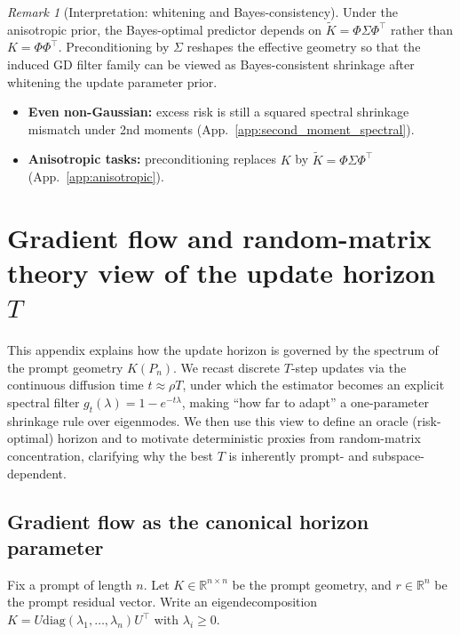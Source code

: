 \documentclass{article}
\theoremstyle{plain}
\theoremstyle{definition}
\theoremstyle{remark}
\newtheorem{remark}[theorem]{Remark}
\begin{document}
\begin{remark}[Interpretation: whitening and Bayes-consistency]
\label{rem:whitening_app}
Under the anisotropic prior, the Bayes-optimal predictor depends on $\widetilde K=\Phi\Sigma\Phi^\top$ rather than $K=\Phi\Phi^\top$. Preconditioning by $\Sigma$ reshapes the effective geometry so that the induced GD filter family can be viewed as Bayes-consistent shrinkage after whitening the update parameter prior.
\end{remark}


\begin{takeawaybox}[title=\textbf{Summary: robustness of the spectral theory}]
\begin{itemize}[leftmargin=*, itemsep=0pt, topsep=0pt]
\item \textbf{Even non-Gaussian:} excess risk is still a squared spectral shrinkage mismatch under 2nd moments (App.~\ref{app:second_moment_spectral}).
\item \textbf{Anisotropic tasks:} preconditioning replaces $K$ by $\widetilde K=\Phi\Sigma\Phi^\top$ (App.~\ref{app:anisotropic}).
\end{itemize}
\end{takeawaybox}





\section{Gradient flow and random-matrix theory view of the update horizon $T$}\label{app:oracle_horizon}

This appendix explains how the update horizon is governed by the spectrum of the prompt geometry $K(P_n)$. We recast discrete $T$-step updates via the continuous diffusion time $t\approx \rho T$, under which the estimator becomes an explicit spectral filter $g_t(\lambda)=1-e^{-t\lambda}$, making “how far to adapt” a one-parameter shrinkage rule over eigenmodes. We then use this view to define an oracle (risk-optimal) horizon and to motivate deterministic proxies from random-matrix concentration, clarifying why the best $T$ is inherently prompt- and subspace-dependent.




\subsection{Gradient flow as the canonical horizon parameter}

Fix a prompt of length $n$. Let $K\in\mathbb{R}^{n\times n}$ be the prompt geometry, and $r\in\mathbb{R}^n$ be the prompt residual vector. Write an eigendecomposition $K=U\mathrm{diag}(\lambda_1,\dots,\lambda_n)U^\top$ with $\lambda_i\ge 0$.
\end{document}

